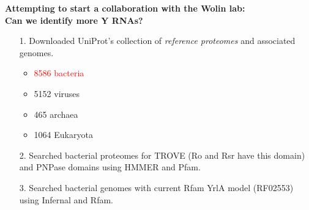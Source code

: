 \documentclass[landscape]{slides}
\begin{document}
\begin{slide}
\begin{center}


\end{center}
\vfill
\end{slide}
\begin{slide}
\begin{center}
\textbf{Attempting to start a collaboration with the Wolin lab: \\ Can
  we identify more Y RNAs?}

\begin{itemize}
\item[1.] Downloaded UniProt's collection of \emph{reference proteomes}
  and associated genomes.
  \begin{itemize}
    \item \textcolor{red}{8586 bacteria}
    \item 5152 viruses
    \item 465 archaea
    \item 1064 Eukaryota
\end{itemize}
\item[2.] Searched bacterial proteomes for TROVE (Ro and Rsr have this
  domain) and PNPase domains using HMMER and Pfam. 
\item[3.] Searched bacterial genomes with current Rfam YrlA model 
  (RF02553) using Infernal and Rfam.
\end{itemize}

\end{center}
\vfill
\end{slide}
\end{document}
